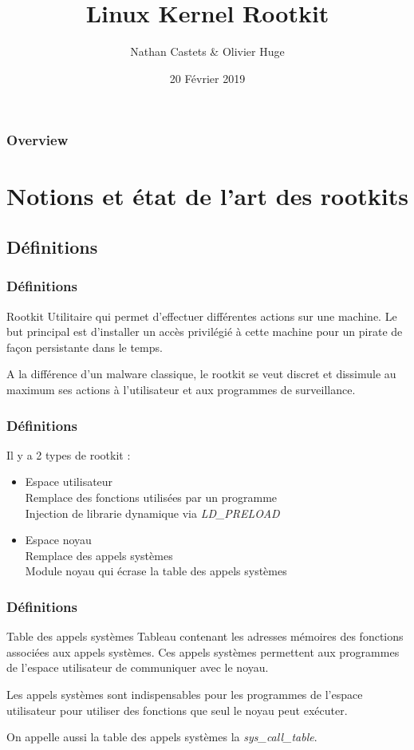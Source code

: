 \documentclass{beamer}
\title[Linux Kernel Rootkit]{Linux Kernel Rootkit}
\author{Nathan Castets \& Olivier Huge}
\institute[UBX]{Université de Bordeaux}
\date{20 Février 2019}
\begin{document}
\begin{frame}
\titlepage
\end{frame}

\begin{frame}
\frametitle{Overview}
\tableofcontents
\end{frame}

\section{Notions et état de l'art des rootkits}
\subsection{Définitions}

\begin{frame}
\frametitle{Définitions}
\begin{block}{Rootkit}
Utilitaire qui permet d'effectuer différentes actions sur une machine. Le but principal est d'installer un accès privilégié à cette machine pour un pirate de façon persistante dans le temps.
\end{block}
\medskip
A la différence d'un malware classique, le rootkit se veut discret et dissimule au maximum ses actions à l'utilisateur et aux programmes de surveillance.
\end{frame}

\begin{frame}
\frametitle{Définitions}
Il y a 2 types de rootkit :
\begin{itemize}
\item 	Espace utilisateur\\
	Remplace des fonctions utilisées par un programme\\
	Injection de librarie dynamique via \textit{LD\_PRELOAD}
\item	Espace noyau\\
	Remplace des appels systèmes\\
	Module noyau qui écrase la table des appels systèmes
\end{itemize}
\end{frame}

\begin{frame}
\frametitle{Définitions}
\begin{block}{Table des appels systèmes}
Tableau contenant les adresses mémoires des fonctions associées aux appels systèmes. Ces appels systèmes permettent aux programmes de l'espace utilisateur de communiquer avec le noyau.
\end{block}
\medskip
Les appels systèmes sont indispensables pour les programmes de l'espace utilisateur pour utiliser des fonctions que seul le noyau peut exécuter.

On appelle aussi la table des appels systèmes la \textit{sys\_call\_table}.
\end{frame}
\end{document}
